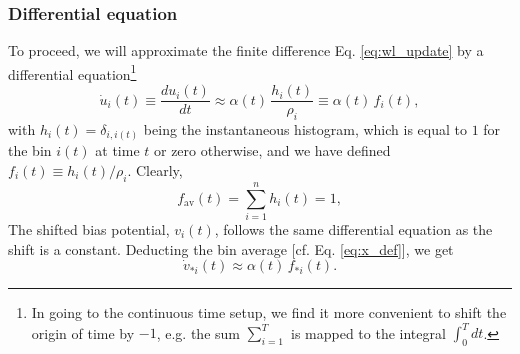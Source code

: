 \documentclass[reprint, superscriptaddress, floatfix]{revtex4-1}
\newcommand{\bav}[1]{#1_\mathrm{av}}
\begin{document}
\subsubsection{\label{sec:sbin_diffeq}
Differential equation}



To proceed, we will
approximate the finite difference Eq. \eqref{eq:wl_update}
by a differential equation\footnote{In
going to the continuous time setup,
we find it more convenient to shift the origin of time by $-1$,
e.g. the sum $\sum_{i=1}^T$ is mapped to the integral $\int_0^T dt$.}
%
\begin{equation}
  \dot u_i(t)
  \equiv
  \frac{ d u_i(t) } { dt }
  \approx
  \alpha(t) \, \frac{ h_i(t) } { \rho_i }
  \equiv
  \alpha(t) \, f_i(t)
  ,
  \label{eq:ut_diffeq}
\end{equation}
%
with
%
$h_i(t) = \delta_{i, i(t)}$
%
being the instantaneous histogram,
which is equal to $1$
for the bin $i(t)$ at time $t$
or zero otherwise,
and we have defined
$f_i(t) \equiv h_i(t) /\rho_i$.
%
Clearly,
%
\begin{equation}
  \bav{f}(t) = \sum_{i=1}^n h_i(t) = 1
  ,
  \label{eq:fav1}
\end{equation}
%
The shifted bias potential, $v_i(t)$,
follows the same differential equation
as the shift is a constant.
%
Deducting the bin average [cf. Eq. \eqref{eq:x_def}],
we get
%
\begin{equation}
  \dot v_{*i}(t)
  \approx
  \alpha(t) \, f_{*i}(t)
  .
  \label{eq:vt_diffeq}
\end{equation}
\end{document}
